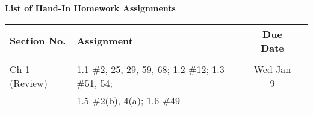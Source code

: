 \documentclass{article}
\begin{document}
\begin{center}
{\bf List of Hand-In Homework Assignments}
\end{center}

\begin{center}
\begin{tabular}{l l c l }
Section No. & Assignment  & Due Date  \\
\hline\\
Ch 1 (Review) & 1.1 \#2, 25, 29, 59, 68; 1.2 \#12; 1.3 \#51, 54; & Wed Jan 9 \\
&  1.5 \#2(b), 4(a); 1.6 \#49 &  \\





  
    
    

 

\end{tabular}
\end{center}
\end{document}
